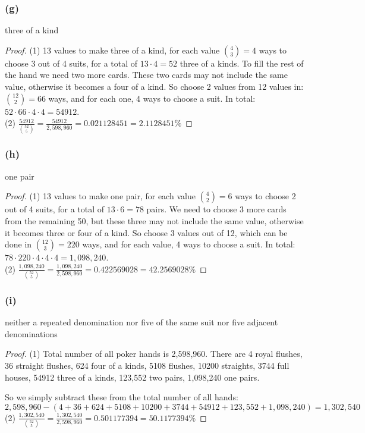 \documentclass[14pt]{extarticle}
\begin{document}
\subsubsection{(g)}
three of a kind

\begin{proof}
     (1) 13 values to make three of a kind, for each value \(\binom{4}{3} = 4\) ways to choose 3 out of 4 suits, for a
     total of \(13 \cdot 4 = 52\) three of a kinds. To fill the rest of the hand we need two more cards. These two cards may
     not include the same value, otherwise it becomes a four of a kind. So choose 2 values from 12 values in: \(\binom{12}{2} =
     66\) ways, and for each one, 4 ways to choose a suit. In total: \(52 \cdot 66 \cdot 4 \cdot 4 = 54912\). \\
     (2) \(\frac{54912}{\binom{52}{5}} = \frac{54912}{2,598,960} = 0.021128451 = 2.1128451\%\)
\end{proof}

\subsubsection{(h)}
one pair

\begin{proof}
     (1) 13 values to make one pair, for each value \(\binom{4}{2} = 6\) ways to choose 2 out of 4 suits, for a total of
     \(13 \cdot 6 = 78\) pairs. We need to choose 3 more cards from the remaining 50, but these three may not include the same
     value, otherwise it becomes three or four of a kind. So choose 3 values out of 12, which can be done in \(\binom{12}{3} =
     220\) ways, and for each value, 4 ways to choose a suit. In total: \(78 \cdot 220 \cdot 4 \cdot 4 \cdot 4 = 1,098,240\).\\
     (2) \(\frac{1,098,240}{\binom{52}{5}} = \frac{1,098,240}{2,598,960} = 0.422569028 = 42.2569028\%\)
\end{proof}

\subsubsection{(i)}
neither a repeated denomination nor five of the same suit nor five adjacent denominations

\begin{proof}
     (1) Total number of all poker hands is 2,598,960. There are 4 royal flushes, 36 straight flushes, 624 four of a kinds, 5108
     flushes, 10200 straights, 3744 full houses, 54912 three of a kinds, 123,552 two pairs, 1,098,240 one pairs.

     So we simply subtract these from the total number of all hands:
     \[
          2,598,960 - (4 + 36 + 624 + 5108 + 10200 + 3744 + 54912 + 123,552 + 1,098,240) = 1,302,540
     \]
     (2) \(\frac{1,302,540}{\binom{52}{5}} = \frac{1,302,540}{2,598,960} = 0.501177394 = 50.1177394\%\)
\end{proof}
\end{document}

